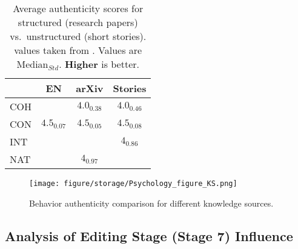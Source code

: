 \begin{table}[t]
    \centering
    \renewcommand{\arraystretch}{1.2} %
    \scriptsize
    \setlength{\tabcolsep}{3.8pt} %


    \begin{tabular}{lccc}
        \toprule
        \rowcolor{gray!20} %
        & \textbf{\dataset{} EN} & \textbf{arXiv} & \textbf{Stories}\\
        \midrule
        COH 
            & \cellcolor{highlightGreen}{$\textbf{4.5}_{\textit{0.00}}$}
            & $4.0_{\textit{0.38}}$
            & $4.0_{\textit{0.46}}$ \\
        CON 
            & $4.5_{\textit{0.07}}$
            & $4.5_{\textit{0.05}}$
            & $4.5_{\textit{0.08}}$ \\
        INT 
            & \cellcolor{highlightGreen}{$\textbf{4.5}_{\textit{0.13}}$}
            & \cellcolor{highlightGreen}{$\textbf{4.5}_{\textit{0.54}}$}
            & $4_{\textit{0.86}}$ \\
        NAT 
            & \cellcolor{highlightGreen}{$\textbf{4.5}_{\textit{0.12}}$}
            & $4_{\textit{0.97}}$
            & \cellcolor{highlightGreen}{$\textbf{4.5}_{\textit{0.73}}$} \\
        \bottomrule
    \end{tabular}
    \caption{Average authenticity scores for structured (research papers) vs.\ unstructured (short stories). \dataset{} values taken from . Values are Median$_{Std}$. \textbf{Higher} is better.}
    \label{tab:app_knowledge_source}
\end{table}





\begin{figure}[t!]
    \centering
    \texttt{[image: figure/storage/Psychology\_figure\_KS.png]}
    \caption{Behavior authenticity comparison for different knowledge sources.}
    \label{fig:app_psychology1}
\end{figure}


\subsection{Analysis of Editing Stage (Stage 7) Influence}
\label{sec:app_refinement}

